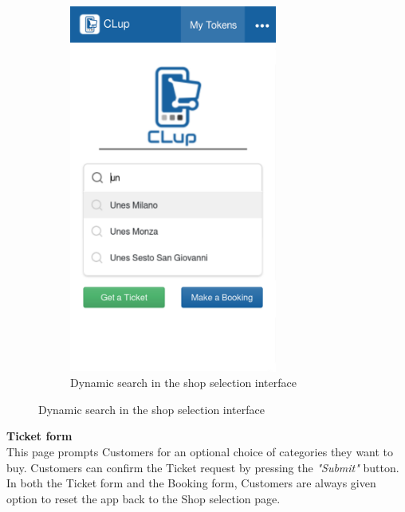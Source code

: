\begin{figure}[H]
\begin{subfigure}{0.5\textwidth}
        \centering
        \includegraphics[width=0.75\textwidth]{Images/search-mockup.png}
        \caption{Dynamic search in the shop selection interface}
    \end{subfigure}
\end{figure}
\pagebreak
\textbf{Ticket form}\\
\label{page:ticket_form}
This page prompts Customers for an optional choice of categories they want to buy. Customers can confirm the Ticket request by pressing the \emph{"Submit"} button. In both the Ticket form and the Booking form, Customers are always given option to reset the app back to the Shop selection page.
